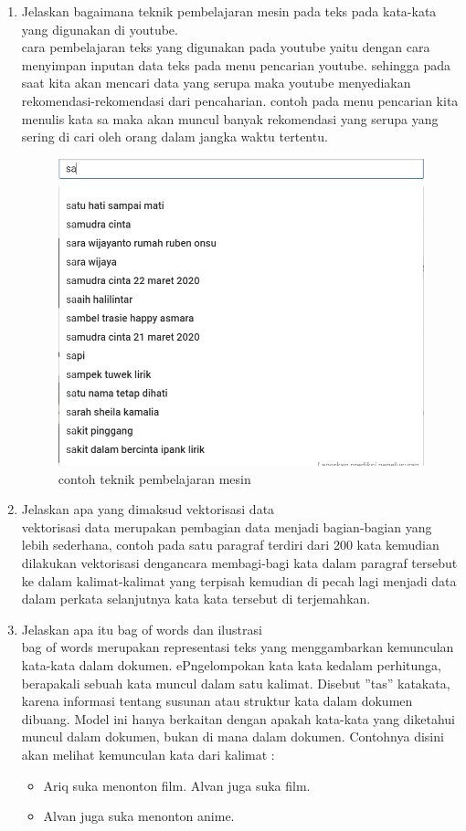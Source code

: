 \begin{enumerate}
\item Jelaskan bagaimana teknik pembelajaran mesin pada teks pada kata-kata yang digunakan di youtube.
	\hfill\\
	cara pembelajaran teks yang digunakan pada youtube yaitu dengan cara menyimpan inputan data teks pada menu pencarian youtube. sehingga pada saat kita akan mencari data yang serupa maka youtube menyediakan rekomendasi-rekomendasi dari pencaharian. contoh pada menu pencarian kita menulis kata sa maka akan muncul banyak rekomendasi yang serupa yang sering di cari oleh orang dalam jangka waktu tertentu.
\begin{figure}[H]
    \includegraphics[width=12cm]{figures/1174084/4/teori3.png}
    \centering
    \caption{contoh teknik pembelajaran mesin}
\end{figure}

\item Jelaskan apa yang dimaksud vektorisasi data
\hfill\\
	vektorisasi data merupakan pembagian data menjadi bagian-bagian yang lebih sederhana, contoh pada satu paragraf terdiri dari 200 kata kemudian dilakukan vektorisasi dengancara membagi-bagi kata dalam paragraf tersebut ke dalam kalimat-kalimat yang terpisah kemudian di pecah lagi menjadi data dalam perkata selanjutnya kata kata tersebut di terjemahkan.	

\item Jelaskan apa itu bag of words dan ilustrasi
	\hfill\\
bag of words merupakan representasi teks yang menggambarkan kemunculan kata-kata dalam dokumen. ePngelompokan kata kata kedalam perhitunga, berapakali sebuah kata muncul dalam satu kalimat. Disebut ”tas” katakata, karena informasi tentang susunan atau struktur kata dalam dokumen dibuang. Model ini hanya berkaitan dengan apakah kata-kata yang diketahui muncul dalam dokumen, bukan di mana dalam dokumen. 
Contohnya disini akan melihat kemunculan kata dari kalimat :
\begin{itemize}
\item Ariq suka menonton film. Alvan juga suka film.
\item Alvan juga suka menonton anime.
\end{itemize}


\end{enumerate}
